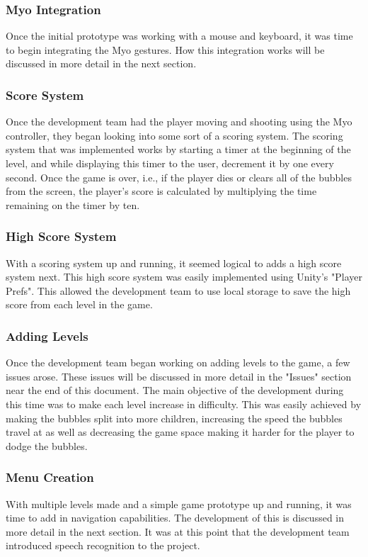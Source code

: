 \documentclass{article}
\begin{document}
\bigskip

\subsubsection{Myo Integration}
Once the initial prototype was working with a mouse and keyboard, it was time to begin integrating the Myo gestures. How this integration works will be discussed in more detail in the next section. 

\subsubsection{Score System}
Once the development team had the player moving and shooting using the Myo controller, they began looking into some sort of a scoring system. The scoring system that was implemented works by starting a timer at the beginning of the level, and while displaying this timer to the user, decrement it by one every second. Once the game is over, i.e., if the player dies or clears all of the bubbles from the screen, the player's score is calculated by multiplying the time remaining on the timer by ten.

\subsubsection{High Score System}
With a scoring system up and running, it seemed logical to adds a high score system next. This high score system was easily implemented using Unity's "Player Prefs". This allowed the development team to use local storage to save the high score from each level in the game.

\subsubsection{Adding Levels}
Once the development team began working on adding levels to the game, a few issues arose. These issues will be discussed in more detail in the "Issues" section near the end of this document. The main objective of the development during this time was to make each level increase in difficulty. This was easily achieved by making the bubbles split into more children, increasing the speed the bubbles travel at as well as decreasing the game space making it harder for the player to dodge the bubbles. 

\subsubsection{Menu Creation}
With multiple levels made and a simple game prototype up and running, it was time to add in navigation capabilities. The development of this is discussed in more detail in the next section. It was at this point that the development team introduced speech recognition to the project. 
\clearpage
\end{document}
